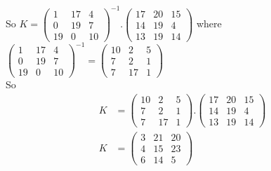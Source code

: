 \documentclass[12pt,a4paper]{article}
\begin{document}
So $K=\begin{pmatrix}
	1&17&4\\0&19&7\\19&0&10
\end{pmatrix}^{-1}.\begin{pmatrix}
17&20&15\\14&19&4\\13&19&14
\end{pmatrix}$ where $\begin{pmatrix}
1&17&4\\0&19&7\\19&0&10
\end{pmatrix}^{-1}=\begin{pmatrix}
10&2&5\\7&2&1\\7&17&1
\end{pmatrix}$\\

So 
\begin{align}
K&=\begin{pmatrix}
	10&2&5\\7&2&1\\7&17&1
\end{pmatrix}.\begin{pmatrix}
17&20&15\\14&19&4\\13&19&14
\end{pmatrix}\\
K&=\begin{pmatrix}
3&21&20\\4&15&23\\6&14&5
\end{pmatrix}
\end{align}
\end{document}

